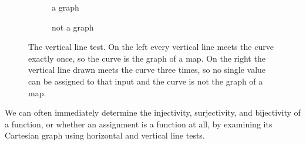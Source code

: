 \begin{figure}[ht!]
  \centering
  \begin{subfigure}[b]{0.45\textwidth}
    \centering
    \caption{a graph}
    \label{fig:is_a_graph}
  \end{subfigure}%
  \hfill%
  \begin{subfigure}[b]{0.45\textwidth}
    \centering
    \caption{not a graph}
    \label{fig:not_a_graph}
  \end{subfigure}
  \caption{The vertical line test. On the left every vertical line meets the curve exactly once, so the curve is the graph of a map. On the right the vertical line drawn meets the curve three times, so no single value can be assigned to that input and the curve is not the graph of a map.}
  \label{fig:vertical_line_test}
\end{figure}

We can often immediately determine the injectivity, surjectivity, and bijectivity of a function, or whether an assignment is a function at all, by examining its Cartesian graph using horizontal and vertical line tests.

